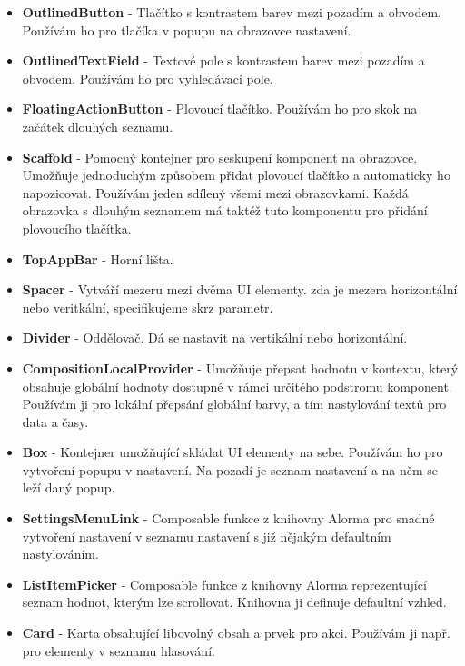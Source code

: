\begin{itemize}
	\item \textbf{OutlinedButton} - Tlačítko s kontrastem barev mezi pozadím a obvodem. Používám ho pro tlačíka v popupu na obrazovce nastavení.

	\item \textbf{OutlinedTextField} - Textové pole s kontrastem barev mezi pozadím a obvodem. Používám ho pro vyhledávací pole.

	\item \textbf{FloatingActionButton} - Plovoucí tlačítko. Používám ho pro skok na začátek dlouhých seznamu.

	\item \textbf{Scaffold} - Pomocný kontejner pro seskupení komponent na obrazovce. Umožňuje jednoduchým způsobem přidat plovoucí tlačítko a automaticky ho napozicovat. Používám jeden sdílený všemi mezi obrazovkami. Každá obrazovka s dlouhým seznamem má taktéž tuto komponentu pro přidání plovoucího tlačítka.

	\item \textbf{TopAppBar} - Horní lišta.

	\item \textbf{Spacer} - Vytváří mezeru mezi dvěma UI elementy. zda je mezera horizontální nebo veritkální, specifikujeme skrz parametr.

	\item \textbf{Divider} - Oddělovač. Dá se nastavit na vertikální nebo horizontální.

	\item \textbf{CompositionLocalProvider} - Umožňuje přepsat hodnotu v kontextu, který obsahuje globální hodnoty dostupné v rámci určitého podstromu komponent. Používám ji pro lokální přepsání globální barvy, a tím nastylování textů pro data a časy.

	\item \textbf{Box} - Kontejner umožňující skládat UI elementy na sebe. Používám ho pro vytvoření popupu v nastavení. Na pozadí je seznam nastavení a na něm se leží daný popup.

	\item \textbf{SettingsMenuLink} - Composable funkce z knihovny Alorma pro snadné vytvoření nastavení v seznamu nastavení s již nějakým defaultním nastylováním.

	\item \textbf{ListItemPicker} - Composable funkce z knihovny Alorma reprezentující seznam hodnot, kterým lze scrollovat. Knihovna ji definuje defaultní vzhled.

	\item \textbf{Card} - Karta obsahující libovolný obsah a prvek pro akci. Používám ji např. pro elementy v seznamu hlasování.


\end{itemize}
